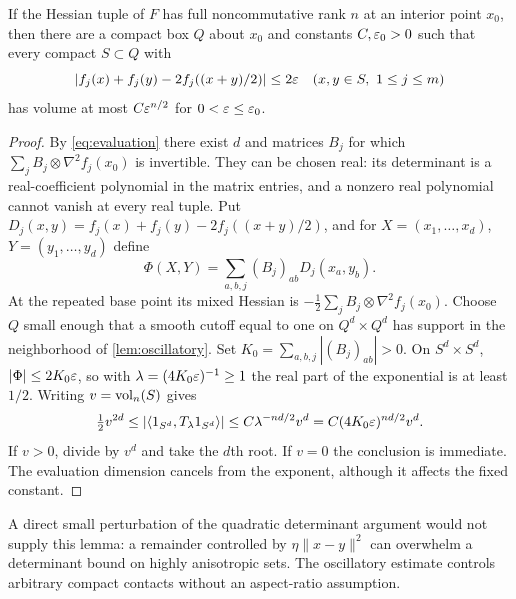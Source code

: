 \begin{lemma}\label{lem:smooth-volume}
If the Hessian tuple of $F$ has full noncommutative rank $n$ at an
interior point $x_0$, then there are a compact box $Q$ about $x_0$ and
constants $C,\varepsilon_0>0$ such that every compact $S\subset Q$ with
\[
 |f_j(x)+f_j(y)-2f_j((x+y)/2)|\le2\varepsilon
 \quad(x,y\in S,\ 1\le j\le m)
\]
has volume at most $C\varepsilon^{n/2}$ for $0<\varepsilon\le\varepsilon_0$.
\end{lemma}
\begin{proof}
By \eqref{eq:evaluation} there exist $d$ and matrices $B_j$ for which
$\sum_j B_j\otimes\nabla^2f_j(x_0)$ is invertible. They can be chosen
real: its determinant is a real-coefficient polynomial in the matrix
entries, and a nonzero real polynomial cannot vanish at every real
tuple. Put $D_j(x,y)=f_j(x)+f_j(y)-2f_j((x+y)/2)$, and for
$X=(x_1,\ldots,x_d)$, $Y=(y_1,\ldots,y_d)$ define
\[
 \Phi(X,Y)=\sum_{a,b,j}(B_j)_{ab}D_j(x_a,y_b).
\]
At the repeated base point its mixed Hessian is
$-\tfrac12\sum_jB_j\otimes\nabla^2f_j(x_0)$.
Choose $Q$ small enough that a smooth cutoff equal to one on
$Q^d\times Q^d$ has support in the neighborhood of
\cref{lem:oscillatory}. Set $K_0=\sum_{a,b,j}|(B_j)_{ab}|>0$.
On $S^d\times S^d$, $|\Phi|\le2K_0\varepsilon$, so with
$\lambda=(4K_0\varepsilon)^{-1}\ge1$ the real part of the exponential is
at least $1/2$. Writing $v=\operatorname{vol}_n(S)$ gives
\[
 \tfrac12v^{2d}
 \le\left|\langle 1_{S^d},T_\lambda1_{S^d}\rangle\right|
 \le C\lambda^{-nd/2}v^d
 =C(4K_0\varepsilon)^{nd/2}v^d.
\]
If $v>0$, divide by $v^d$ and take the $d$th root. If $v=0$ the
conclusion is immediate. The evaluation dimension cancels from the
exponent, although it affects the fixed constant.
\end{proof}

A direct small perturbation of the quadratic determinant argument would
not supply this lemma: a remainder controlled by
$\eta\|x-y\|^2$ can overwhelm a determinant bound on highly anisotropic
sets. The oscillatory estimate controls arbitrary compact contacts
without an aspect-ratio assumption.

